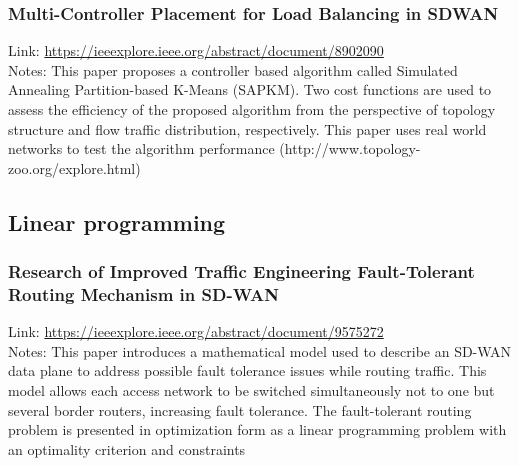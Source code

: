 \documentclass{article}
\newcommand{\paperEntry}[3]{
	\subsubsection{#2}
	Link: \href{#1}{#1}\\
	Notes: #3 \\
}
\begin{document}
	\paperEntry{https://ieeexplore.ieee.org/abstract/document/8902090}
	{Multi-Controller Placement for
		Load Balancing in SDWAN}
	{This paper proposes a controller based algorithm called Simulated Annealing Partition-based K-Means (SAPKM). Two cost functions are used to assess the efficiency of the proposed algorithm from the perspective of topology structure and flow traffic distribution, respectively.
	This paper uses real world networks to test the algorithm performance (http://www.topology-zoo.org/explore.html)}	
		
	\subsection{Linear programming}

	\paperEntry{https://ieeexplore.ieee.org/abstract/document/9575272}
	{Research of Improved Traffic Engineering Fault-Tolerant Routing Mechanism in SD-WAN }
	{This paper introduces a mathematical model used to describe an SD-WAN data plane to address possible fault tolerance issues while routing traffic. This model allows each access network to be switched simultaneously not to one but several border routers, increasing fault tolerance.
	The fault-tolerant routing problem is presented in
	optimization form as a linear programming problem with an
	optimality criterion and constraints}

	
\end{document}
